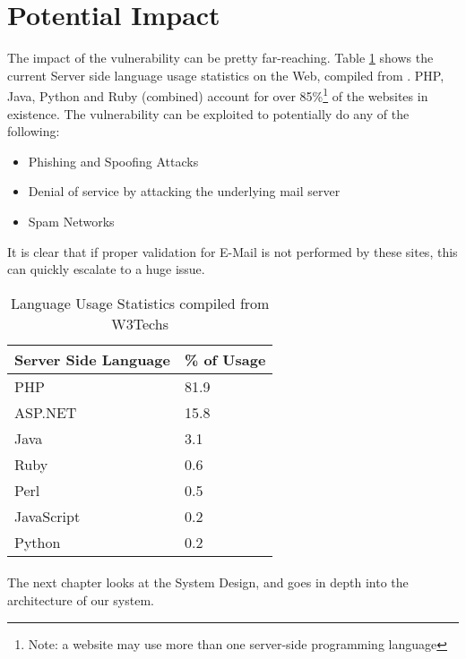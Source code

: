 \section{Potential Impact}

The impact of the vulnerability can be pretty far-reaching.
Table \ref{tab:usage} shows the current Server side language usage statistics on the Web, compiled from \cite{W3techs}. 
PHP, Java, Python and Ruby (combined) account for over 85\%\footnote{Note: a website may use more than one server-side programming language} of the websites in existence. The vulnerability can be exploited to potentially do any of the following:
\begin{itemize}
	\item Phishing and Spoofing Attacks
	\item Denial of service by attacking the underlying mail server
	\item Spam Networks
\end{itemize}

It is clear that if proper validation for E-Mail is not performed by these sites, this can quickly escalate to a huge issue.
 

\begin{table}[!htbp]
	\centering
	\begin{tabular}{|p{4cm}|p{4cm}|}
		\hline
		Server Side Language & \% of Usage\\
		\hline
		PHP & 81.9\\
		\hline	
		ASP.NET	& 15.8\\
		\hline
		Java & 3.1\\
		\hline
		Ruby & 	0.6\\
		\hline
		Perl &	0.5\\
		\hline
		JavaScript & 0.2\\
		\hline
		Python & 0.2\\
		\hline
				
	\end{tabular}
	\caption{Language Usage Statistics compiled from W3Techs}
	\label{tab:usage}
\end{table}

\paragraph{}
The next chapter looks at the System Design, and goes in depth into the architecture of our system.
